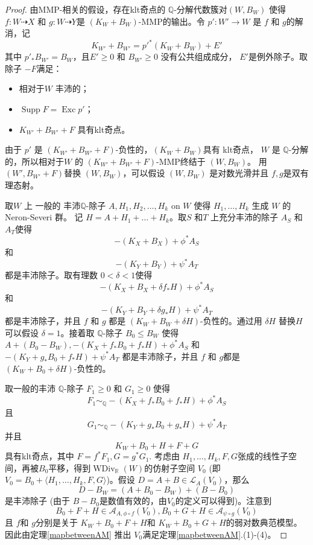 \begin{proof}
  由MMP-相关的假设，存在klt奇点的 $\mathbb{Q}$-分解代数簇对$(W,B_{W})$ 使得 $f:W\dashrightarrow X$ 和 $g:W \dashrightarrow Y$是 $(K_{W}+B_{W})$-MMP的输出。令 $p':W'\to W$ 是 $f$ 和 $g$的解消，记
  \[ K_{W'}+B_{W'}=p'^*(K_{W}+B_{W})+E' \]
  其中  $p'_*B_{W'}=B_{W}$，且$E'\geqslant 0$ 和 $B_{W'}\geqslant 0$ 没有公共组成成分， $E'$是例外除子。取 除子 $-F$满足：
\begin{itemize}
  \item 相对于$W$ 丰沛的；
  \item $\operatorname{Supp}F=\operatorname{Exc}p'$；
  \item  $K_{W'}+B_{W'}+F$ 具有klt奇点。 
\end{itemize}
  由于 $p'$ 是 $(K_{W'}+ B_{W'}+F)$-负性的，$(K_{W}+B_{W})$具有 klt奇点， $W$ 是 $\mathbb{Q}$-分解的，所以相对于$W$ 的 $(K_{W'}+B_{W'}+F)$-MMP终结于 $(W,B_{W})$。 用 $(W',B_{W'} +F)$替换 $(W,B_{W})$，可以假设 $(W,B_{W})$ 是对数光滑并且 $f,g$是双有理态射。 

  取$W$ 上 一般的 丰沛$\mathbb{Q}$-除子 $A, H_{1},H_{2},\ldots ,H_{k}$ on $W$ 使得 $H_{1},\ldots , H_{k}$ 生成 $W$ 的 Neron-Severi 群。 记 $H=A+H_{1}+\ldots+ H_{k}$。取$S$ 和$T$ 上充分丰沛的除子 $A_{S}$ 和 $A_{T}$使得 
  \[ -(K_{X}+B_{X})+\phi^*A_{S} \]
  和
  \[ -(K_{Y}+B_{Y})+\psi^*A_{T} \]
  都是丰沛除子。取有理数 $0<\delta<1$使得 
  \[ -(K_{X}+B_{X}+\delta f_*H)+\phi^*A_{S} \]
  和
  \[-(K_{Y}+B_{Y}+\delta g_*H)+\psi^*A_{T} \]
  都是丰沛除子，并且  $f$ 和  $g$ 都是  $(K_{W}+B_{W}+\delta H)$-负性的。通过用 $\delta H$ 替换$H$可以假设 $\delta=1$。接着取 $\mathbb{Q}$-除子 $B_{0}\leqslant B_{W}$ 使得 $A+(B_{0}-B_{W}), -(K_{X}+ f_*B_{0}+f_*H)+\phi^*A_{S}$ 和 $-(K_{Y}+ g_*B_{0}+f_*H)+\psi^*A_{T}$ 都是丰沛除子，并且 $f$ 和  $g$都是  $(K_{W}+B_{0}+\delta H)$-负性的。

  取一般的丰沛 $\mathbb{Q}$-除子 $F_{1}\geqslant 0$ 和 $G_{1}\geqslant 0$ 使得 
    \[ F_{1}\sim_{\mathbb{Q}} -(K_{X}+f_*B_{0}+ f_*H)+\phi^*A_{S} \]
  且
    \[G_{1}\sim_{\mathbb{Q}} -(K_{Y}+g_*B_{0}+ g_*H)+\psi^*A_{T} \]
  并且
  \[ K_{W}+B_{0}+H+F+G \]
  具有klt奇点，其中 $F=f^*F_{1},G=g^*G_{1}$.
  考虑由 $H_{1},\ldots , H_{k},F,G$张成的线性子空间，再被$B_{0}$平移，得到$\operatorname{WDiv}_{\mathbb{R}}(W)$的仿射子空间 $V_{0}$ (即 $V_{0}=B_{0}+ \langle H_{1},\ldots ,H_{k},F,G \rangle  $)。假设 $D=A+B \in \mathcal{L}_{A}(V_{0})$，那么
  \[ D-B_W=(A+B_{0}-B_{W})+(B-B_{0}) \]
  是丰沛除子 (由于 $B-B_{0}$是数值有效的，由$V_{0}$的定义可以得到)。注意到
  \[ B_{0}+F+H \in \mathcal{A}_{A,\phi\circ f}(V_{0}), B_{0}+G+H \in \mathcal{A}_{\psi \circ g}(V_{0}) \]
  且 $f$和 $g$分别是关于  $K_{W}+B_{0}+F+H$和 $K_{W}+B_{0}+G+H$的弱对数典范模型。因此由定理\ref{mapbetweenAM} 推出 $V_{0}$满足定理\ref{mapbetweenAM}.(1)-(4)。


\end{proof}
